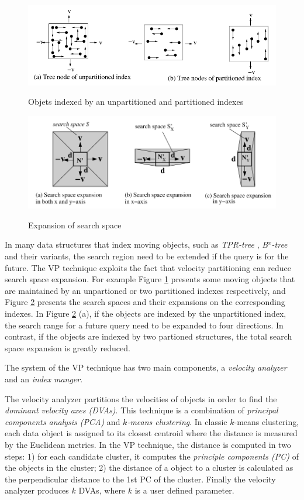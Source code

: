 \documentclass[paper=a4, fontsize=18pt]{article} %
\numberwithin{equation}{section} %
\numberwithin{figure}{section} %
\numberwithin{table}{section} %
\begin{document}
\begin{figure}[h]
  \centering
  \includegraphics[width=.7\linewidth]{7_11_obj.png}\\
  \caption{Objets indexed by an unpartitioned and partitioned indexes}\label{fig:VP_obj}
\end{figure}

\begin{figure}[h]
  \centering
  \includegraphics[width=.7\linewidth]{7_11_exp.png}\\
  \caption{Expansion of search space}\label{fig:VP_exp}
\end{figure}

In many data structures that index moving objects, such as \emph{TPR-tree} \cite{SJLL00}, \emph{B$^x$-tree} \cite{JLO04} and their variants, the search region need to be extended if the query is for the future. The VP technique exploits the fact that velocity partitioning can reduce search space expansion. For example Figure \ref{fig:VP_obj} presents some moving objects that are maintained by an unpartioned or two partitioned indexes respectively, and Figure \ref{fig:VP_exp} presents the search spaces and their expansions on the corresponding indexes. In Figure \ref{fig:VP_exp} (a), if the objects are indexed by the unpartitioned index, the search range for a future query need to be expanded to four directions. In contrast, if the objects are indexed by two partioned structures, the total search space expansion is greatly reduced.

The system of the VP technique has two main components, a \emph{velocity analyzer} and an \emph{index manger}.

The velocity analyzer partitions the velocities of objects in order to find the \emph{dominant velocity axes (DVAs)}. This technique is a combination of \emph{principal components analysis (PCA)} and \emph{$k$-means clustering}. In classic $k$-means clustering, each data object is assigned to its closest centroid where the distance is measured by the Euclidean metrics. In the VP technique, the distance is computed in two steps: 1) for each candidate cluster, it computes the \emph{principle components (PC)} of the objects in the cluster; 2) the distance of a object to a cluster is calculated as the perpendicular distance to the 1st PC of the cluster. Finally the velocity analyzer produces $k$ DVAs, where $k$ is a user defined parameter.
\end{document}
